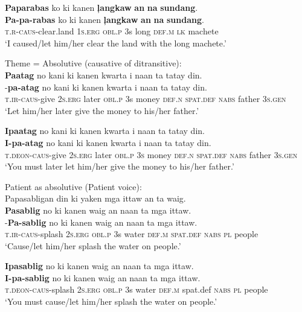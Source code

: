 \ea
\textbf{Paparabas}  ko  ki  kanen  \textbf{ļangkaw}  \textbf{an}  \textbf{na}  \textbf{sundang}. \\\smallskip
\gll \textbf{Pa-pa-rabas}  ko  ki  kanen  \textbf{ļangkaw}  \textbf{an}  \textbf{na}  \textbf{sundang}. \\
\textsc{t.r}-\textsc{caus}-clear.land  1\textsc{s.erg}  \textsc{obl.p}  3s  long  \textsc{def.m}  \textsc{lk}  machete \\
\glt ‘I caused/let him/her clear the land with the long machete.’
\z

\ea
Theme = Absolutive (causative of ditransitive): \\
\textbf{Paatag}  no  kani  ki  kanen  kwarta  i  naan ta  tatay  din. \\\smallskip
\gll \emptyset{}-\textbf{pa-atag}  no  kani  ki  kanen  kwarta  i  naan ta  tatay  din. \\
\textsc{t.ir}-\textsc{caus}-give  2\textsc{s.erg}  later  \textsc{obl.p}  3s  money  \textsc{def.n}  \textsc{spat.def} \textsc{nabs}  father  3\textsc{s.gen} \\
\glt `Let him/her later give the money to his/her father.’
\z

\ea
\textbf{Ipaatag}  no  kani  ki  kanen  kwarta  i  naan ta  tatay  din. \\\smallskip
\gll \textbf{I-pa-atag}  no  kani  ki  kanen  kwarta  i  naan ta  tatay  din. \\
\textsc{t.deon}-\textsc{caus}-give  2\textsc{s.erg} later  \textsc{obl.p}  \textsc{3s} money \textsc{def.n}  \textsc{spat.def}
\textsc{nabs} father  3\textsc{s.gen} \\
\glt `You must later let him/her give the money to his/her father.’
\z

\ea
Patient as absolutive (Patient voice): \\
Papasabligan din ki yaken mga ittaw an ta waig. \\
\textbf{Pasablig}  no  ki  kanen  waig  an  naan  ta  mga  ittaw. \\\smallskip
\gll \emptyset{}-\textbf{Pa-sablig}  no  ki  kanen  waig  an  naan  ta  mga  ittaw. \\
\textsc{t.ir}-\textsc{caus}-splash  2\textsc{s.erg}  \textsc{obl.p}  3s  water  \textsc{def.m} \textsc{spat.def} \textsc{nabs}  \textsc{pl}  people \\
\glt ‘Cause/let him/her splash the water on people.’
\z



\ea
\textbf{Ipasablig}  no  ki  kanen  waig  an  naan  ta  mga  ittaw. \\\smallskip
\gll \textbf{I-pa-sablig}  no  ki  kanen  waig  an  naan  ta  mga  ittaw. \\
\textsc{t.deon}-\textsc{caus}-splash  2\textsc{s.erg}  \textsc{obl.p}  3s  water  \textsc{def.m} {spat.def}\textsc{} \textsc{nabs}  \textsc{pl}  people \\
\glt ‘You must cause/let him/her splash the water on people.’
\z

